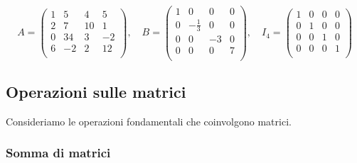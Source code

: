 \[
    A = \begin{pmatrix}
        1   &5   &4  &5\\
        2   &7   &10 &1\\
        0   &34  &3  &-2\\
        6   &-2  &2  &12\\
    \end{pmatrix}, \quad
    B = \begin{pmatrix}
        1   &0              &0  &0\\
        0   &-\frac{1}{3}   &0 &0\\
        0   &0              &-3  &0\\
        0   &0              &0  &7\\
    \end{pmatrix}, \quad
    I_{4} = \begin{pmatrix}
        1   &0  &0  &0\\
        0   &1  &0 &0\\
        0   &0  &1  &0\\
        0   &0  &0  &1\\
    \end{pmatrix}
\]

\subsection{Operazioni sulle matrici}

Consideriamo le operazioni fondamentali che coinvolgono matrici.

\subsubsection{Somma di matrici}

